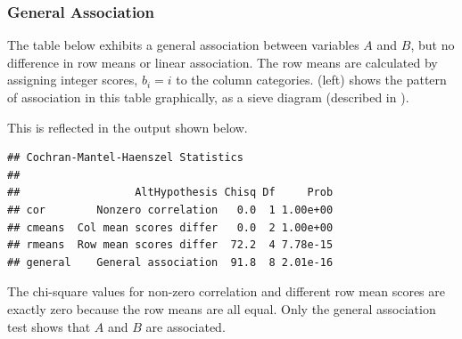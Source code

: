 \documentclass[11pt]{book}
\renewenvironment{knitrout}{\small\renewcommand{\baselinestretch}{.85}}{} %
\begin{document}
\subsubsection{General Association}
The table below exhibits a
general association between variables $A$ and $B$, but no difference in
row means or linear association.  The row means are calculated by
assigning integer scores, $b_i = i$ to the column categories.
(left) shows
the pattern of association in this table graphically, as a sieve diagram
(described in ).




This is reflected in the  output shown below.
\begin{knitrout}
\color{fgcolor}\begin{kframe}
\begin{alltt}
\end{alltt}
\begin{verbatim}
## Cochran-Mantel-Haenszel Statistics 
## 
##                  AltHypothesis Chisq Df     Prob
## cor        Nonzero correlation   0.0  1 1.00e+00
## cmeans  Col mean scores differ   0.0  2 1.00e+00
## rmeans  Row mean scores differ  72.2  4 7.78e-15
## general    General association  91.8  8 2.01e-16
\end{verbatim}
\end{kframe}
\end{knitrout}

The chi-square values for non-zero correlation and different
row mean scores are exactly zero because the row means are all equal.
Only the general association test shows that $A$ and $B$
are associated.
\end{document}
